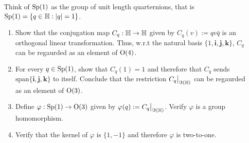 \documentclass[12pt]{book}
\theoremstyle{definition}
\begin{document}
\begin{taggedexercise}[\textcolor{green}{Complete}]
  Think of $\mathrm{Sp}(1)$ as the group of unit length quarternions, that is $\mathrm{Sp}(1) = \{ q \in \mathbb{H} : |q| = 1 \}$.
  \begin{enumerate}
    \item Show that the conjugation map $C_q : \mathbb{H} \to \mathbb{H}$ given by $C_q(v) := q v \bar{q}$ is an orthogonal linear transformation. Thus, w.r.t the natural basis $\{1, \mathbf{i}, \mathbf{j}, \mathbf{k}\}$, $C_q$ can be regaurded as an element of $\mathrm{O}(4)$.
    \item For every $q \in \mathrm{Sp}(1)$, show that $C_q(1) = 1$ and therefore that $C_q$ sends $\text{span}\{\mathbf{i}, \mathbf{j}, \mathbf{k}\}$ to itself. Conclude that the restriction $C_q \big|_{\Im(\mathbb{H})}$ can be regaurded as an element of $\mathrm{O}(3)$.
    \item Define $\varphi : \mathrm{Sp}(1) \to \mathrm{O}(3)$ given by $\varphi(q) := C_q \big|_{\Im(\mathbb{H})}$. Verify $\varphi$ is a group homomorphism.
    \item Verify that the kernel of $\varphi$ is $\{1, -1\}$ and therefore $\varphi$ is two-to-one.
  \end{enumerate}
\end{taggedexercise}
\end{document}
